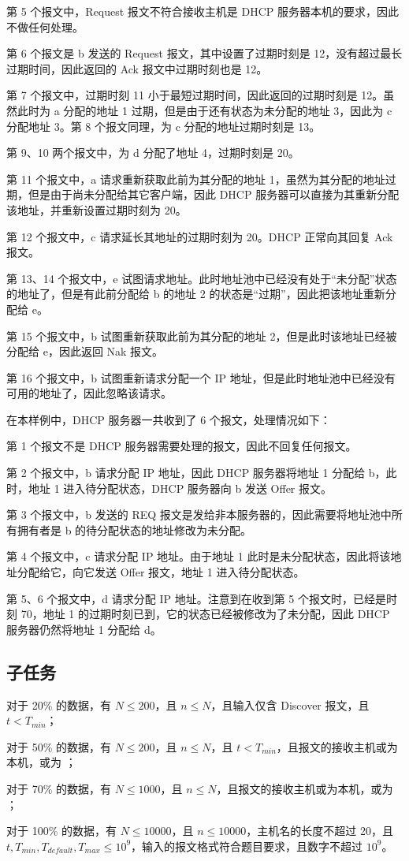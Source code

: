 第 5 个报文中，Request 报文不符合接收主机是 DHCP 服务器本机的要求，因此不做任何处理。

第 6 个报文是 b 发送的 Request 报文，其中设置了过期时刻是 12，没有超过最长过期时间，因此返回的 Ack 报文中过期时刻也是 12。

第 7 个报文中，过期时刻 11 小于最短过期时间，因此返回的过期时刻是 12。虽然此时为 a 分配的地址 1 过期，但是由于还有状态为未分配的地址 3，因此为 c 分配地址 3。第 8 个报文同理，为 c 分配的地址过期时刻是 13。

第 9、10 两个报文中，为 d 分配了地址 4，过期时刻是 20。

第 11 个报文中，a 请求重新获取此前为其分配的地址 1，虽然为其分配的地址过期，但是由于尚未分配给其它客户端，因此 DHCP 服务器可以直接为其重新分配该地址，并重新设置过期时刻为 20。

第 12 个报文中，c 请求延长其地址的过期时刻为 20。DHCP 正常向其回复 Ack 报文。

第 13、14 个报文中，e 试图请求地址。此时地址池中已经没有处于“未分配”状态的地址了，但是有此前分配给 b 的地址 2 的状态是“过期”，因此把该地址重新分配给 e。

第 15 个报文中，b 试图重新获取此前为其分配的地址 2，但是此时该地址已经被分配给 e，因此返回 Nak 报文。

第 16 个报文中，b 试图重新请求分配一个 IP 地址，但是此时地址池中已经没有可用的地址了，因此忽略该请求。

\examplebox*{}{}

在本样例中，DHCP 服务器一共收到了 6 个报文，处理情况如下：

第 1 个报文不是 DHCP 服务器需要处理的报文，因此不回复任何报文。

第 2 个报文中，b 请求分配 IP 地址，因此 DHCP 服务器将地址 1 分配给 b，此时，地址 1 进入待分配状态，DHCP 服务器向 b 发送 Offer 报文。

第 3 个报文中，b 发送的 REQ 报文是发给非本服务器的，因此需要将地址池中所有拥有者是 b 的待分配状态的地址修改为未分配。

第 4 个报文中，c 请求分配 IP 地址。由于地址 1 此时是未分配状态，因此将该地址分配给它，向它发送 Offer 报文，地址 1 进入待分配状态。

第 5、6 个报文中，d 请求分配 IP 地址。注意到在收到第 5 个报文时，已经是时刻 70，地址 1 的过期时刻已到，它的状态已经被修改为了未分配，因此 DHCP 服务器仍然将地址 1 分配给 d。

\subsection*{子任务}

对于 20\% 的数据，有 $N\le 200$，且 $n\le N$，且输入仅含 Discover 报文，且 $t < T_{min}$；

对于 50\% 的数据，有 $N\le 200$，且 $n\le N$，且 $t < T_{min}$，且报文的接收主机或为本机，或为 \*；

对于 70\% 的数据，有 $N\le 1000$，且 $n\le N$，且报文的接收主机或为本机，或为 \*；

对于 100\% 的数据，有 $N\le 10000$，且 $n\le 10000$，主机名的长度不超过 20，且 $t,T_{min},T_{default},T_{max}\le 10^9$，输入的报文格式符合题目要求，且数字不超过 $10^9$。